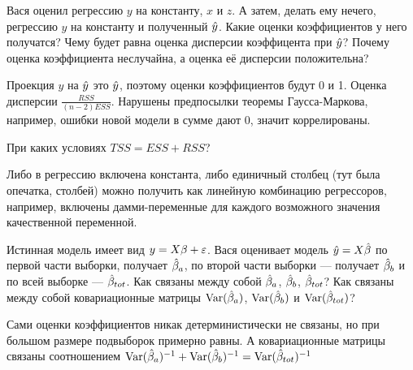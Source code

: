 \begin{problem}
Вася оценил регрессию $y$ на константу, $x$ и $z$. А затем, делать ему нечего, регрессию $y$ на константу и полученный $\hat{y}$. Какие оценки коэффициентов у него получатся? Чему будет равна оценка дисперсии коэффицента при $\hat{y}$? Почему оценка коэффициента неслучайна, а оценка её дисперсии положительна?


\begin{sol}
Проекция $y$ на $\hat{y}$ это $\hat{y}$, поэтому оценки коэффициентов будут 0 и 1. Оценка дисперсии $\frac{RSS}{(n-2)ESS}$. Нарушены предпосылки теоремы Гаусса-Маркова, например, ошибки новой модели в сумме дают 0, значит коррелированы.
\end{sol}
\end{problem}




\begin{problem}
При каких условиях $TSS=ESS+RSS$?

\begin{sol}
Либо в регрессию включена константа, либо единичный столбец (тут была опечатка, столбей) можно получить как линейную комбинацию регрессоров, например, включены дамми-переменные для каждого возможного значения качественной переменной.
\end{sol}
\end{problem}





\begin{problem}
Истинная модель имеет вид $y=X\beta +\varepsilon$. Вася оценивает модель $\hat{y}=X \hat{\beta}$ по первой части выборки, получает $\hat{\beta}_a$, по второй части выборки — получает $\hat{\beta}_b$ и по всей выборке — $\hat{\beta}_{tot}$. Как связаны между собой $\hat{\beta}_a$, $\hat{\beta}_b$, $\hat{\beta}_{tot}$? Как связаны между собой ковариационные матрицы $\operatorname{Var}(\hat{\beta}_a)$,  $\operatorname{Var}(\hat{\beta}_b)$ и  $\operatorname{Var}(\hat{\beta}_{tot})$?


\begin{sol}
Сами оценки коэффициентов никак детерминистически не связаны, но при большом размере подвыборок примерно равны. А ковариационные матрицы связаны соотношением $\operatorname{Var}(\hat{\beta}_a)^{-1}+\operatorname{Var}(\hat{\beta}_b)^{-1}=\operatorname{Var}(\hat{\beta}_{tot})^{-1}$
\end{sol}
\end{problem}





